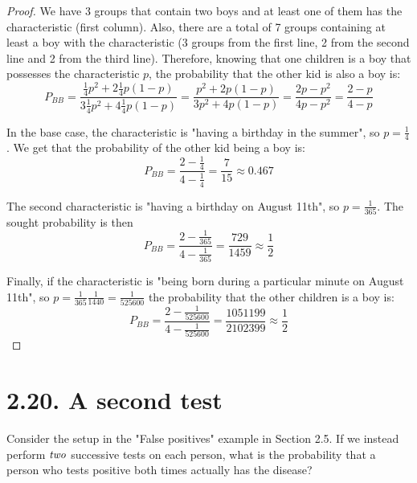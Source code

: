 \begin{proof}
    We have 3 groups that contain two boys and at least one of them has the characteristic
    (first column). Also, there are a total of 7 groups containing at least a boy with the 
    characteristic (3 groups from the first line, 2 from the second
    line and 2 from the third line). Therefore, knowing that one children is a boy that possesses
    the characteristic $p$, the probability that the other kid is also a boy is:
    \[
        P_{BB} = \frac{\frac{1}{4}p^2 + 2 \frac{1}{4}p(1 - p)}{3 \frac{1}{4}p^2 + 4 \frac{1}{4} p(1 - p)}
        = \frac{p^2 + 2p(1 - p)}{3p^2 + 4p(1 - p)}
        = \frac{2p - p^2}{4p - p^2} 
        = \frac{2 - p}{4 - p}
    \] 

    In the base case, the characteristic is "having a birthday in the summer", so $p = \frac{1}{4}$.
    We get that the probability of the other kid being a boy is:
    \[
        P_{BB} = \frac{2 - \frac{1}{4}}{4 - \frac{1}{4}} = \frac{7}{15} \approx 0.467
    \] 

    The second characteristic is "having a birthday on August 11th", so $p = \frac{1}{365}$.
    The sought probability is then
    \[
        P_{BB} = \frac{2 - \frac{1}{365}}{4 - \frac{1}{365}} = \frac{729}{1459} \approx \frac{1}{2}
    \] 

    Finally, if the characteristic is "being born during a particular minute on August 11th", 
    so $p = \frac{1}{365} \frac{1}{1440} = \frac{1}{525600}$
    the probability that the other children is a boy is:
    \[
        P_{BB} = \frac{2 - \frac{1}{525600}}{4 - \frac{1}{525600}} = \frac{1051199}{2102399} \approx \frac{1}{2}
    \] 
\end{proof}

\section*{2.20. A second test}
Consider the setup in the "False positives" example in Section 2.5. If we instead perform 
$\emph{two}$ successive tests on each person, what is the probability that a person
who tests positive both times actually has the disease?

